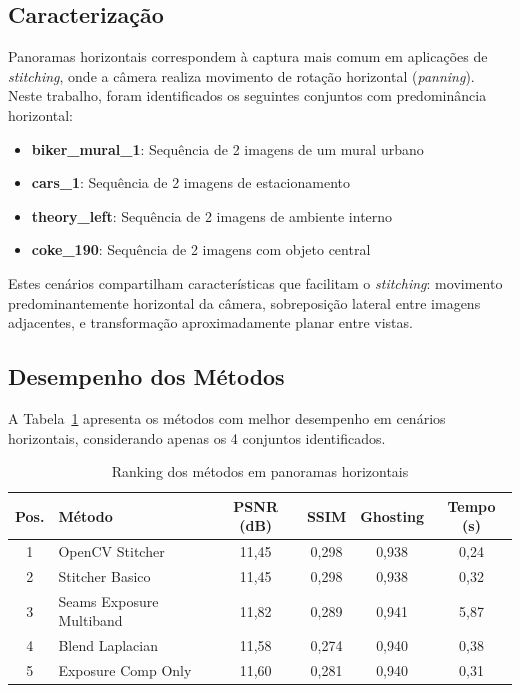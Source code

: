 \subsection{Caracterização}

Panoramas horizontais correspondem à captura mais comum em aplicações de \textit{stitching}, onde a câmera realiza movimento de rotação horizontal (\textit{panning}). Neste trabalho, foram identificados os seguintes conjuntos com predominância horizontal:

\begin{itemize}
    \item \textbf{biker\_mural\_1}: Sequência de 2 imagens de um mural urbano
    \item \textbf{cars\_1}: Sequência de 2 imagens de estacionamento
    \item \textbf{theory\_left}: Sequência de 2 imagens de ambiente interno
    \item \textbf{coke\_190}: Sequência de 2 imagens com objeto central
\end{itemize}

Estes cenários compartilham características que facilitam o \textit{stitching}: movimento predominantemente horizontal da câmera, sobreposição lateral entre imagens adjacentes, e transformação aproximadamente planar entre vistas.

\subsection{Desempenho dos Métodos}

A Tabela~\ref{tab:horizontal-ranking} apresenta os métodos com melhor desempenho em cenários horizontais, considerando apenas os 4 conjuntos identificados.

\begin{table}[htb]
\centering
\caption{Ranking dos métodos em panoramas horizontais}
\label{tab:horizontal-ranking}
\small
\begin{tabular}{clcccc}
\hline
\textbf{Pos.} & \textbf{Método} & \textbf{PSNR (dB)} & \textbf{SSIM} & \textbf{Ghosting} & \textbf{Tempo (s)} \\ \hline
1 & OpenCV Stitcher & 11,45 & 0,298 & 0,938 & 0,24 \\
2 & Stitcher Basico & 11,45 & 0,298 & 0,938 & 0,32 \\
3 & Seams Exposure Multiband & 11,82 & 0,289 & 0,941 & 5,87 \\
4 & Blend Laplacian & 11,58 & 0,274 & 0,940 & 0,38 \\
5 & Exposure Comp Only & 11,60 & 0,281 & 0,940 & 0,31 \\
\hline
\end{tabular}
\end{table}

